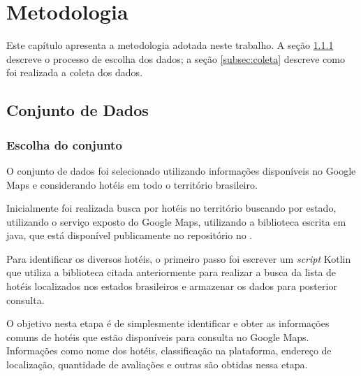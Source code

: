 \chapter{Metodologia}
\label{cap:metodologia}

Este capítulo apresenta a metodologia adotada neste trabalho. A seção \ref{subsec:escolha_conjunto} descreve o processo de escolha dos dados; a seção \ref{subsec:coleta} descreve como foi realizada a coleta dos dados.


\section{Conjunto de Dados}


\subsection{Escolha do conjunto}
\label{subsec:escolha_conjunto}

O conjunto de dados foi selecionado utilizando informações disponíveis no Google Maps e considerando hotéis em todo o território brasileiro.

Inicialmente foi realizada busca por hotéis no território buscando por estado, utilizando o serviço exposto do Google Maps, utilizando a biblioteca escrita em java,  que está disponível publicamente no repositório no .

Para identificar os diversos hotéis, o primeiro passo foi escrever um \emph{script} Kotlin  que utiliza a biblioteca citada anteriormente para realizar a busca da lista de hotéis localizados nos estados brasileiros e armazenar os dados para posterior consulta.

O objetivo nesta etapa é de simplesmente identificar e obter as informações comuns de hotéis que estão disponíveis para consulta no Google Maps. Informações como nome dos hotéis, classificação na plataforma, endereço de localização, quantidade de avaliações e outras são obtidas nessa etapa.






